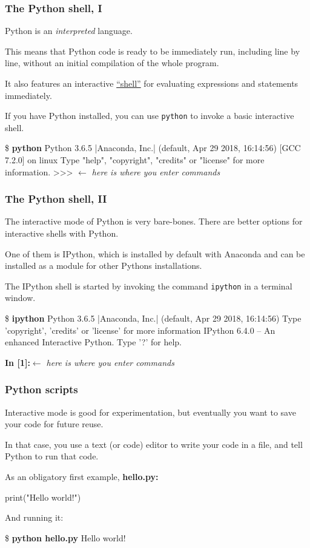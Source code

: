 \documentclass[english,serif,mathserif,xcolor=pdftex,dvipsnames,table]{beamer}
\begin{document}
\begin{frame}[fragile]
  \frametitle{The Python shell, I}
  Python is an \emph{interpreted} language.

  \+
  This means that Python code is ready to be immediately run,
  including line by line, without an initial compilation of the whole program.

  \+
  It also features an interactive
  \href{http://en.wikipedia.org/wiki/REPL}{``shell''} for evaluating
  expressions and statements immediately.

  \+
  If you have Python installed, you can use \texttt{python} to invoke
  a basic interactive shell.
\begin{semiverbatim}\tiny
\$ \textbf{python}
Python 3.6.5 |Anaconda, Inc.| (default, Apr 29 2018, 16:14:56) 
[GCC 7.2.0] on linux
Type "help", "copyright", "credits" or "license" for more information.
>{}>{}> {\color{blue}\normalfont\em \(\leftarrow\) here is where you enter commands}
\end{semiverbatim}
\end{frame}

\begin{frame}[fragile]
  \frametitle{The Python shell, II}
  The interactive mode of Python is very bare-bones.
  There are better options for interactive shells with Python.
  
  \+
  One of them is IPython, which is installed by default with Anaconda and can be installed
  as a module for other Pythons installations.

  \+
  The IPython shell is started by invoking the command
  \texttt{ipython} in a terminal window.
\begin{semiverbatim}\tiny
\$ \textbf{ipython}
Python 3.6.5 |Anaconda, Inc.| (default, Apr 29 2018, 16:14:56) 
Type 'copyright', 'credits' or 'license' for more information
IPython 6.4.0 -- An enhanced Interactive Python. Type '?' for help.

\textbf{In [1]:}{\color{blue}\normalfont\em \(\leftarrow\) here is where you enter commands}
\end{semiverbatim}
\end{frame}

\begin{frame}[fragile]
  \frametitle{Python scripts}
  Interactive mode is good for experimentation, but eventually you want
  to save your code for future reuse.

  \+
  In that case, you use a text (or code) editor to write your code in a file,
  and tell Python to run that code.

  \+
  As an obligatory first example, \textbf{hello.py:} 

\begin{semiverbatim}
print("Hello world!")
\end{semiverbatim}

  And running it:

\begin{semiverbatim}
\$ \textbf{python hello.py} 
Hello world!
\end{semiverbatim}
\end{frame}
\end{document}
